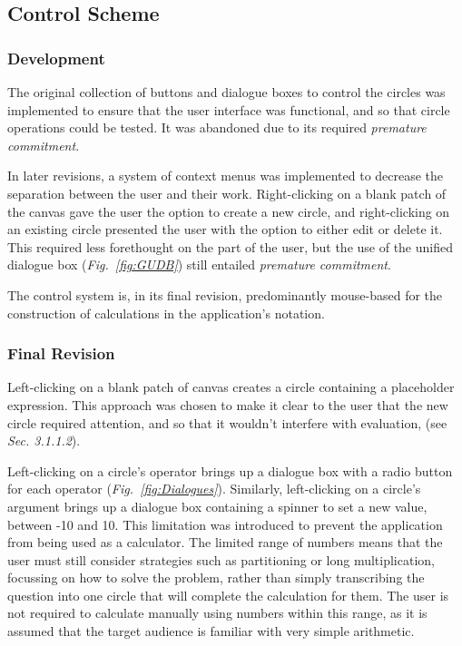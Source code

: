 \documentclass[12pt,twoside,notitlepage,xetex]{report}
\begin{document}
\subsection{Control Scheme}


\subsubsection{Development}

The original collection of buttons and dialogue boxes to control the circles was implemented to ensure that the user interface was functional, and so that circle operations could be tested.  It was abandoned due to its required \emph{premature commitment}.

In later revisions, a system of context menus was implemented to decrease the separation between the user and their work.  Right-clicking on a blank patch of the canvas gave the user the option to create a new circle, and right-clicking on an existing circle presented the user with the option to either edit or delete it.  This required less forethought on the part of the user, but the use of the unified dialogue box (\emph{Fig.~\ref{fig:GUDB}}) still entailed \emph{premature commitment}.

The control system is, in its final revision, predominantly mouse-based for the construction of calculations in the application's notation.

\subsubsection{Final Revision}

Left-clicking on a blank patch of canvas creates a circle containing a placeholder expression.  This approach was chosen to make it clear to the user that the new circle required attention, and so that it wouldn't interfere with evaluation, (see \emph{Sec. 3.1.1.2}).

Left-clicking on a circle's operator brings up a dialogue box with a radio button for each operator (\emph{Fig.~\ref{fig:Dialogues}}).  Similarly, left-clicking on a circle's argument brings up a dialogue box containing a spinner to set a new value, between -10 and 10.  This limitation was introduced to prevent the application from being used as a calculator.  The limited range of numbers means that the user must still consider strategies such as partitioning or long multiplication, focussing on how to solve the problem, rather than simply transcribing the question into one circle that will complete the calculation for them.  The user is not required to calculate manually using numbers within this range, as it is assumed that the target audience is familiar with very simple arithmetic.
\end{document}
